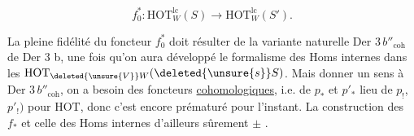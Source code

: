 \[
 f_0^*:\mathrm{HOT}_W^{\mathrm{lc}}(S)\longrightarrow\mathrm{HOT}_W^{\mathrm{lc}}(S').
\]

La pleine fidélité du foncteur $f_0^*$ doit résulter de  la variante naturelle Der $3\,b''_{\mathrm{coh}}$ de Der 3 b, une fois qu'on aura développé le formalisme des  Homs internes dans les $\mathrm{HOT}_{\deleted{\unsure{V}}W}(\deleted{\unsure{s}}S)$. Mais  donner un sens à Der $3\,b''_{\mathrm{coh}}$, on a besoin des foncteurs \uline{cohomologiques}, i.e. de $p_*$ et $p'_*$  lieu de $p_!$, $p'_!)$ pour $\mathrm{HOT}$, donc c'est encore prématuré pour l'instant. La construction des $f_*$ et celle des Homs internes  d'ailleurs sûrement $\pm$ .


